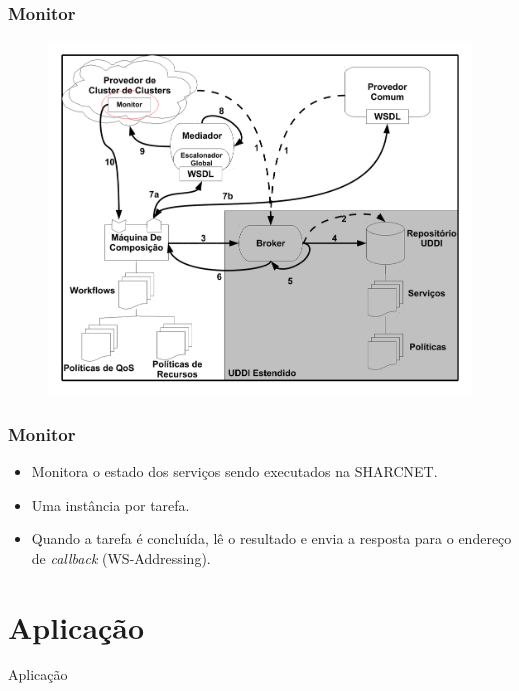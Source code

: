 \documentclass[red, cover=invisible, theme=Warsaw]{myslides}
\begin{document}
	\begin{frame} \frametitle{Monitor}
	    \begin{center}
		\begin{figure}
		\includegraphics[scale=0.25]{imagens/execComposicaoA-6.pdf}    
		\end{figure}
	    \end{center}
	\end{frame}
	
	\begin{frame} \frametitle{Monitor}
	    \begin{itemize}
		\item Monitora o estado dos serviços sendo executados na SHARCNET.
		\item Uma instância por tarefa.
		\item Quando a tarefa é concluída, lê o resultado e envia a resposta para o endereço de \textit{callback} (WS-Addressing).
	    \end{itemize}
	\end{frame}        

    
\section{Aplicação}
    \begin{frame}
	\begin{center}
	{\Huge Aplicação}
	\end{center}
    \end{frame}
    
\end{document}
